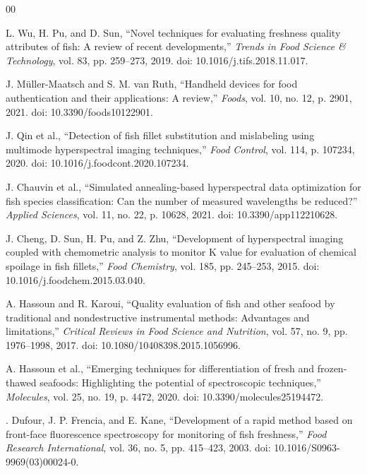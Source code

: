 \documentclass[conference]{IEEEtran}
\begin{document}
\balance
\begin{thebibliography}{00}

L. Wu, H. Pu, and D. Sun, ``Novel techniques for evaluating freshness quality attributes of fish: A review of recent developments,'' \textit{Trends in Food Science \& Technology}, vol. 83, pp. 259--273, 2019. doi: 10.1016/j.tifs.2018.11.017.

J. M{\"u}ller-Maatsch and S. M. van Ruth, ``Handheld devices for food authentication and their applications: A review,'' \textit{Foods}, vol. 10, no. 12, p. 2901, 2021. doi: 10.3390/foods10122901.

J. Qin et al., ``Detection of fish fillet substitution and mislabeling using multimode hyperspectral imaging techniques,'' \textit{Food Control}, vol. 114, p. 107234, 2020. doi: 10.1016/j.foodcont.2020.107234.

J. Chauvin et al., ``Simulated annealing-based hyperspectral data optimization for fish species classification: Can the number of measured wavelengths be reduced?'' \textit{Applied Sciences}, vol. 11, no. 22, p. 10628, 2021. doi: 10.3390/app112210628.

J. Cheng, D. Sun, H. Pu, and Z. Zhu, ``Development of hyperspectral imaging coupled with chemometric analysis to monitor K value for evaluation of chemical spoilage in fish fillets,'' \textit{Food Chemistry}, vol. 185, pp. 245--253, 2015. doi: 10.1016/j.foodchem.2015.03.040.

A. Hassoun and R. Karoui, ``Quality evaluation of fish and other seafood by traditional and nondestructive instrumental methods: Advantages and limitations,'' \textit{Critical Reviews in Food Science and Nutrition}, vol. 57, no. 9, pp. 1976--1998, 2017. doi: 10.1080/10408398.2015.1056996.

A. Hassoun et al., ``Emerging techniques for differentiation of fresh and frozen-thawed seafoods: Highlighting the potential of spectroscopic techniques,'' \textit{Molecules}, vol. 25, no. 19, p. 4472, 2020. doi: 10.3390/molecules25194472.

. Dufour, J. P. Frencia, and E. Kane, ``Development of a rapid method based on front-face fluorescence spectroscopy for monitoring of fish freshness,'' \textit{Food Research International}, vol. 36, no. 5, pp. 415--423, 2003. doi: 10.1016/S0963-9969(03)00024-0.


\end{thebibliography}
\end{document}
